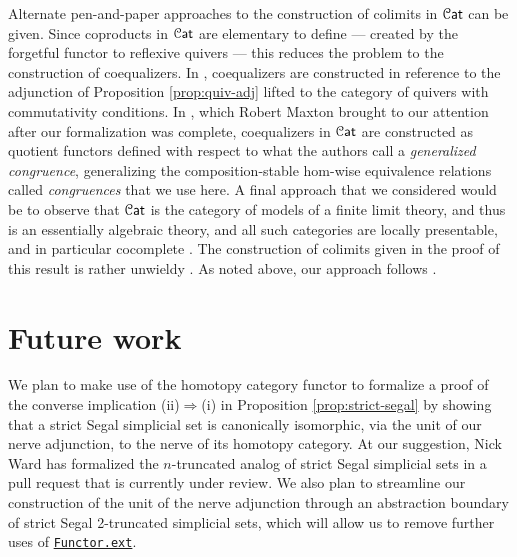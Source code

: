 \documentclass[a4paper,UKenglish,cleveref, autoref, thm-restate]{lipics-v2021}
\newcommand{\cat}[1]{\textup{\textsf{#1}}}%
\newcommand{\1}{\mathbbe{1}}
\newcommand{\2}{\mathbbe{2}}
\newcommand{\3}{\mathbbe{3}}
\newcommand{\Cat}{\mathcal{C}\cat{at}}
\newcommand{\cdoc}[2][]{\href{https://leanprover-community.github.io/mathlib4_docs/find/?pattern=CategoryTheory.#1#2\#doc}{\texttt{#2}}}
\begin{document}
Alternate pen-and-paper approaches to the construction of colimits in $\Cat$ can be given. Since coproducts in $\Cat$ are elementary to define --- created by the forgetful functor to reflexive quivers --- this reduces the problem to the construction of coequalizers. In \cite[5.1.7]{Borceux:1994hbI}, coequalizers are constructed in reference to the adjunction of Proposition \ref{prop:quiv-adj} lifted to the category of quivers with commutativity conditions.  In \cite{BBP:Generalized}, which Robert Maxton brought to our attention after our formalization was complete, coequalizers in $\Cat$ are constructed as quotient functors defined with respect to what the authors call a \emph{generalized congruence}, generalizing the composition-stable hom-wise equivalence relations called \emph{congruences} that we use here. A final approach that we considered would be to observe that $\Cat$ is the category of models of a finite limit theory, and thus is an essentially algebraic theory, and all such categories are locally presentable, and in particular cocomplete \cite[\S 3.D]{AdamekRosicky}. The construction of colimits given in the proof of this result is rather unwieldy \cite[3.36]{AdamekRosicky}. As noted above, our approach follows \cite[4.5.16]{Riehl:2016cc}.

\section{Future work}\label{sec:future}

We plan to make use of the homotopy category functor to formalize a proof of the converse implication (ii)$\Rightarrow$(i) in Proposition \ref{prop:strict-segal} by showing that a strict Segal simplicial set is canonically isomorphic, via the unit of our nerve adjunction, to the nerve of its homotopy category. At our suggestion, Nick Ward has formalized the $n$-truncated analog of strict Segal simplicial sets in a pull request that is currently under review. We also plan to streamline our construction of the unit of the nerve adjunction through an abstraction boundary of strict Segal 2-truncated simplicial sets, which will allow us to remove further uses of \cdoc{Functor.ext}.
\end{document}
